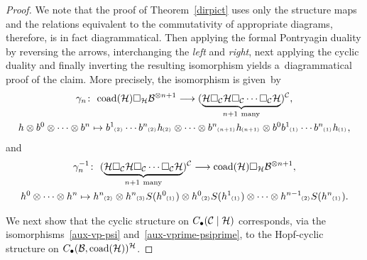 \documentclass[pdftex]{sigma}
\numberwithin{equation}{section}
\newcommand{\ps}[1]{~\hspace{-4pt}_{^{(#1)}}}
\begin{document}
\begin{proof}
We note that the proof of Theorem~\ref{dirpict} uses only the structure maps and the relations equivalent to the
commutativity of appropriate diagrams, therefore, is in fact diagrammatical.
Then applying the formal Pontryagin duality by reversing the arrows, interchanging the \emph{left} and \emph{right},
next applying the cyclic duality and f\/inally inverting the resulting isomorphism yields a~diagrammatical proof of the
claim.
More precisely, the isomorphism is given~by
\begin{gather}
\gamma_n\colon \ {\rm coad}({\cal H}) \Box_{\cal H} {\cal B}^{\otimes n+1}
\longrightarrow (\underset{n+1~\text{many}}{\underbrace{{\cal H} \Box_{\cal C} {\cal H} \Box_{\cal C} \cdots \Box_{\cal C} {\cal H}}})^{\cal C},
\nonumber
\\
h\otimes b^0\otimes\cdots\otimes b^n \mapsto
b^1\ps{2}\cdots b^n\ps{2}h\ps{2} \otimes\cdots\otimes b^n\ps{n+1}h\ps{n+1}\otimes b^0b^1\ps{1}\cdots b^n\ps{1}h\ps{1},
\label{aux-vp-psi}
\end{gather}
and
\begin{gather}
\gamma^{-1}_n\colon \ (\underset{n+1~\text{many}}{\underbrace{{\cal H} \Box_{\cal C} {\cal H} \Box_{\cal C} \cdots \Box_{\cal C}
{\cal H}}})^{\cal C} \longrightarrow {\rm coad}({\cal H}) \Box_{\cal H} {\cal B}^{\otimes n+1},
\nonumber
\\
h^0\otimes\cdots\otimes h^n \mapsto h^n\ps{2}\otimes h^n\ps{3}S(h^0\ps{1})\otimes h^0\ps{2}S(h^1\ps{1})
\otimes\cdots\otimes h^{n-1}\ps{2}S(h^n\ps{1}).
\label{aux-vprime-psiprime}
\end{gather}

We next show that the cyclic structure on $C_\bullet({\cal C}\mid {\cal H})$ corresponds, via the
isomorphisms~\eqref{aux-vp-psi} and~\eqref{aux-vprime-psiprime}, to the Hopf-cyclic structure on $C_\bullet({\cal
B},{\rm coad}({\cal H}))^{\cal H}$.


\end{proof}
\end{document}
